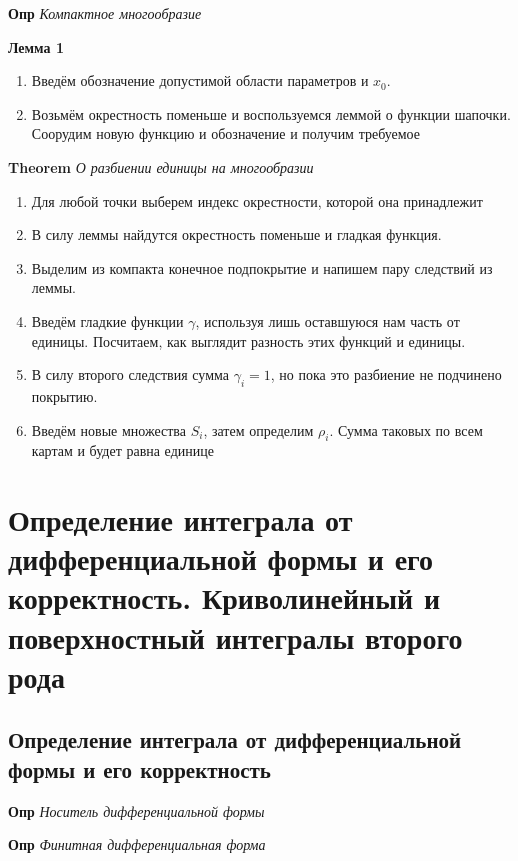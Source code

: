 \documentclass[a4paper, 14pt]{article}
\begin{document}
    \textbf{Опр} \textit{Компактное многообразие}
    
    \textbf{Лемма 1}
    
    \begin{enumerate}
        \item Введём обозначение допустимой области параметров и $x_0$.
        \item Возьмём окрестность поменьше и воспользуемся леммой о функции шапочки.
        Соорудим новую функцию и обозначение и получим требуемое
    \end{enumerate}
    
    \textbf{Theorem} \textit{О разбиении единицы на многообразии}
    
    \begin{enumerate}
        \item Для любой точки выберем индекс окрестности, которой она принадлежит
        \item В силу леммы найдутся окрестность поменьше и гладкая функция.
        \item Выделим из компакта конечное подпокрытие и напишем пару следствий из леммы.
        \item Введём гладкие функции $\gamma$, используя лишь оставшуюся нам часть от единицы.
        Посчитаем, как выглядит разность этих функций и единицы.
        \item В силу второго следствия сумма $\gamma_i = 1$, но пока это разбиение не подчинено покрытию.
        \item Введём новые множества $S_i$, затем определим $\rho_i$.
        Сумма таковых по всем картам и будет равна единице
    \end{enumerate}
    
    \section{Определение интеграла от дифференциальной формы и его корректность.
    Криволинейный и поверхностный интегралы второго рода}
    
    \subsection{Определение интеграла от дифференциальной формы и его корректность}
    
    \textbf{Опр} \textit{Носитель дифференциальной формы}
    
    \textbf{Опр} \textit{Финитная дифференциальная форма}
    
\end{document}
